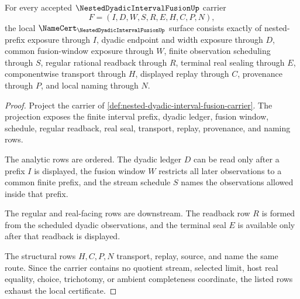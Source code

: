 \begin{theorem}
\label{thm:nested-dyadic-interval-fusion-namecert-obligations}
For every accepted $\NestedDyadicIntervalFusionUp$ carrier
$$
F=(I,D,W,S,R,E,H,C,P,N),
$$
the local $\NameCert_{\NestedDyadicIntervalFusionUp}$ surface consists exactly of nested-prefix exposure through $I$, dyadic endpoint and width exposure through $D$, common fusion-window exposure through $W$, finite observation scheduling through $S$, regular rational readback through $R$, terminal real sealing through $E$, componentwise transport through $H$, displayed replay through $C$, provenance through $P$, and local naming through $N$.
\end{theorem}
\begin{proof}
Project the carrier of \autoref{def:nested-dyadic-interval-fusion-carrier}. The projection exposes the finite interval prefix, dyadic ledger, fusion window, schedule, regular readback, real seal, transport, replay, provenance, and naming rows.

The analytic rows are ordered. The dyadic ledger $D$ can be read only after a prefix $I$ is displayed, the fusion window $W$ restricts all later observations to a common finite prefix, and the stream schedule $S$ names the observations allowed inside that prefix.

The regular and real-facing rows are downstream. The readback row $R$ is formed from the scheduled dyadic observations, and the terminal seal $E$ is available only after that readback is displayed.

The structural rows $H,C,P,N$ transport, replay, source, and name the same route. Since the carrier contains no quotient stream, selected limit, host real equality, choice, trichotomy, or ambient completeness coordinate, the listed rows exhaust the local certificate.
\end{proof}

